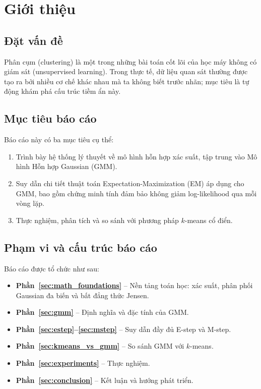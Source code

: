
\section{Giới thiệu}
\label{sec:introduction}

\subsection{Đặt vấn đề}
Phân cụm (clustering) là một trong những bài toán cốt lõi của học máy không có
giám sát (unsupervised learning). Trong thực tế, dữ liệu quan sát thường được tạo
ra bởi nhiều cơ chế khác nhau mà ta không biết trước nhãn; mục tiêu là tự động
khám phá cấu trúc tiềm ẩn này.


\subsection{Mục tiêu báo cáo}
Báo cáo này có ba mục tiêu cụ thể:
\begin{enumerate}[label=(\arabic*)]
  \item Trình bày hệ thống lý thuyết về mô hình hỗn hợp xác suất, tập trung
        vào Mô hình Hỗn hợp Gaussian (GMM).
  \item Suy dẫn chi tiết thuật toán Expectation-Maximization (EM) áp dụng
        cho GMM, bao gồm chứng minh tính đảm bảo không giảm log-likelihood
        qua mỗi vòng lặp.
  \item Thực nghiệm, phân tích và so sánh với phương pháp $k$-means cổ điển.
\end{enumerate}

\subsection{Phạm vi và cấu trúc báo cáo}
Báo cáo được tổ chức như sau:
\begin{itemize}
  \item \textbf{Phần~\ref{sec:math_foundations}} – Nền tảng toán học: xác suất,
        phân phối Gaussian đa biến và bất đẳng thức Jensen.
  \item \textbf{Phần~\ref{sec:gmm}} – Định nghĩa và đặc tính của GMM.
  \item \textbf{Phần~\ref{sec:estep}–\ref{sec:mstep}} – Suy dẫn đầy đủ
        E-step và M-step.
  \item \textbf{Phần~\ref{sec:kmeans_vs_gmm}} – So sánh GMM với $k$-means.
  \item \textbf{Phần~\ref{sec:experiments}} – Thực nghiệm.
  \item \textbf{Phần~\ref{sec:conclusion}} – Kết luận và hướng phát triển.
\end{itemize}

